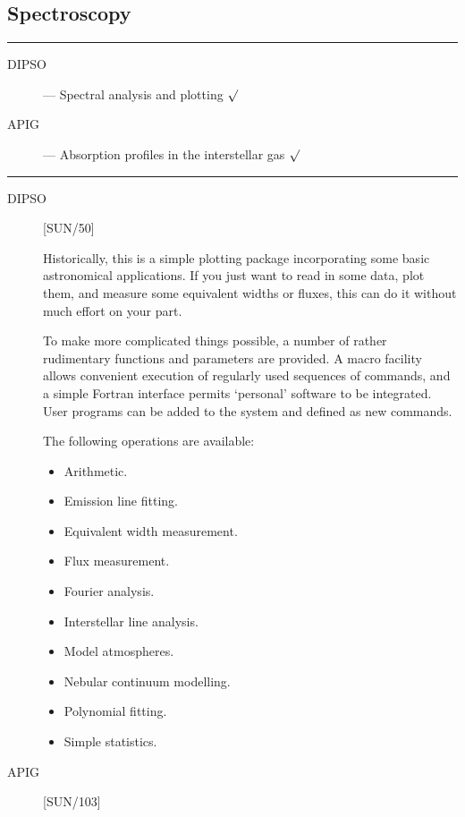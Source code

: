 \newpage

\subsection{Spectroscopy}

\rule{\textwidth}{0.5mm}
\begin{description}
\begin{description}
\item [DIPSO] --- Spectral analysis and plotting \hfill $\surd$
\item [APIG] --- Absorption profiles in the interstellar gas \hfill $\surd$
\end{description}
\end{description}
\rule{\textwidth}{0.5mm}

\begin{description}

\item [DIPSO] \hfill [SUN/50]

Historically, this is a simple plotting package incorporating some basic
astronomical applications.
If you just want to read in some data, plot them, and measure some equivalent
widths or fluxes, this can do it without much effort on your part.

To make more complicated things possible, a number of rather rudimentary
functions and parameters are provided.
A macro facility allows convenient execution of regularly used sequences of
commands, and a simple Fortran interface permits `personal' software to be
integrated.
User programs can be added to the system and defined as new commands.

The following operations are available:
\begin{itemize}
\item Arithmetic.
\item Emission line fitting.
\item Equivalent width measurement.
\item Flux measurement.
\item Fourier analysis.
\item Interstellar line analysis.
\item Model atmospheres.
\item Nebular continuum modelling.
\item Polynomial fitting.
\item Simple statistics.
\end{itemize}

\item [APIG] \hfill [SUN/103]


\end{description}
